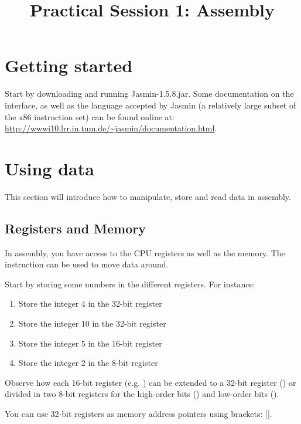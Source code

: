 \documentclass{../../tp}
\title{Practical Session 1: Assembly}
\author{}
\begin{document}
\maketitle


\section{Getting started}

Start by downloading and running \textsf{Jasmin-1.5.8.jar}. Some documentation on the interface, as well as the language accepted by Jasmin (a relatively large subset of the x86 instruction set) can be found online at: \url{http://wwwi10.lrr.in.tum.de/~jasmin/documentation.html}.


\section{Using data}

This section will introduce how to manipulate, store and read data in assembly.

\subsection{Registers and Memory}

In assembly, you have access to the CPU registers as well as the memory. The  instruction can be used to move data around. 

\begin{instruction}
Start by storing some numbers in the different registers. For instance:
	\begin{enumerate}
		\item Store the integer 4 in the 32-bit  register
		\item Store the integer 10 in the 32-bit  register 
		\item Store the integer 5 in the 16-bit  register
		\item Store the integer 2 in the 8-bit  register
	\end{enumerate}
\end{instruction}


Observe how each 16-bit register (e.g. ) can be extended to a 32-bit register () or divided in two 8-bit registers for the high-order bits () and low-order bits (). 

You can use 32-bit registers as memory address pointers using brackets: []. 
\end{document}
